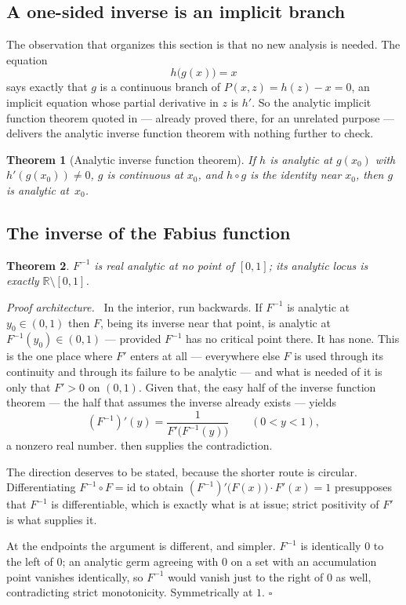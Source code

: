 \documentclass[11pt,oneside]{article}
\newtheorem{theorem}{Theorem}[section]
\theoremstyle{definition}
\theoremstyle{remark}
\newcommand{\R}{\mathbb R}
\newenvironment{proofidea}{\par\smallskip\noindent\textit{Proof architecture.}\ }{\hfill$\square$\par\smallskip}
\begin{document}
\subsection{A one-sided inverse is an implicit branch}

The observation that organizes this section is that no new analysis is
needed.  The equation
\[
  h\bigl(g(x)\bigr)=x
\]
says exactly that $g$ is a continuous branch of $P(x,z)=h(z)-x=0$, an implicit
equation whose partial derivative in $z$ is $h'$.  So the analytic implicit
function theorem quoted in  --- already proved there, for
an unrelated purpose --- delivers the analytic inverse function theorem with
nothing further to check.

\begin{theorem}[Analytic inverse function theorem]\label{thm:ift}
If $h$ is analytic at $g(x_0)$ with $h'(g(x_0))\ne0$, $g$ is continuous at
$x_0$, and $h\circ g$ is the identity near $x_0$, then $g$ is analytic
at~$x_0$.
\end{theorem}

\subsection{The inverse of the Fabius function}

\begin{theorem}\label{thm:invnowhere}
$F^{-1}$ is real analytic at no point of $[0,1]$; its analytic locus is
exactly $\R\setminus[0,1]$.
\end{theorem}

\begin{proofidea}
In the interior, run  backwards.  If $F^{-1}$ is analytic at
$y_0\in(0,1)$ then $F$, being its inverse near that point, is analytic at
$F^{-1}(y_0)\in(0,1)$ --- provided $F^{-1}$ has no critical point there.  It
has none.  This is the one place where $F'$ enters at all --- everywhere else
$F$ is used through its continuity and through its failure to be analytic ---
and what is needed of it is only that $F'>0$ on $(0,1)$.  Given that, the easy
half of the inverse function theorem --- the half that assumes the inverse
already exists --- yields
\[
  (F^{-1})'(y)=\frac{1}{F'\bigl(F^{-1}(y)\bigr)}\qquad(0<y<1),
\]
a nonzero real number.   then supplies the contradiction.

The direction deserves to be stated, because the shorter route is circular.
Differentiating $F^{-1}\circ F=\mathrm{id}$ to obtain
$(F^{-1})'\bigl(F(x)\bigr)\cdot F'(x)=1$ presupposes that $F^{-1}$ is
differentiable, which is exactly what is at issue; strict positivity of $F'$
is what supplies it.

At the endpoints the argument is different, and simpler.  $F^{-1}$ is
identically $0$ to the left of $0$; an analytic germ agreeing with $0$ on a
set with an accumulation point vanishes identically, so $F^{-1}$ would vanish
just to the right of $0$ as well, contradicting strict monotonicity.
Symmetrically at $1$.
\end{proofidea}
\end{document}
